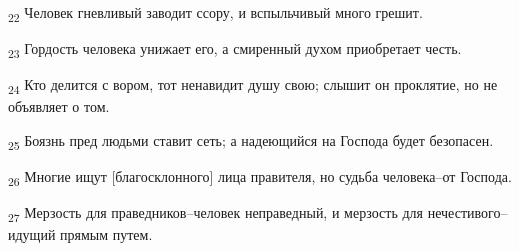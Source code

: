 \begin{tcolorbox}
\textsubscript{22} Человек гневливый заводит ссору, и вспыльчивый много грешит.
\end{tcolorbox}
\begin{tcolorbox}
\textsubscript{23} Гордость человека унижает его, а смиренный духом приобретает честь.
\end{tcolorbox}
\begin{tcolorbox}
\textsubscript{24} Кто делится с вором, тот ненавидит душу свою; слышит он проклятие, но не объявляет о том.
\end{tcolorbox}
\begin{tcolorbox}
\textsubscript{25} Боязнь пред людьми ставит сеть; а надеющийся на Господа будет безопасен.
\end{tcolorbox}
\begin{tcolorbox}
\textsubscript{26} Многие ищут [благосклонного] лица правителя, но судьба человека--от Господа.
\end{tcolorbox}
\begin{tcolorbox}
\textsubscript{27} Мерзость для праведников--человек неправедный, и мерзость для нечестивого--идущий прямым путем.
\end{tcolorbox}
